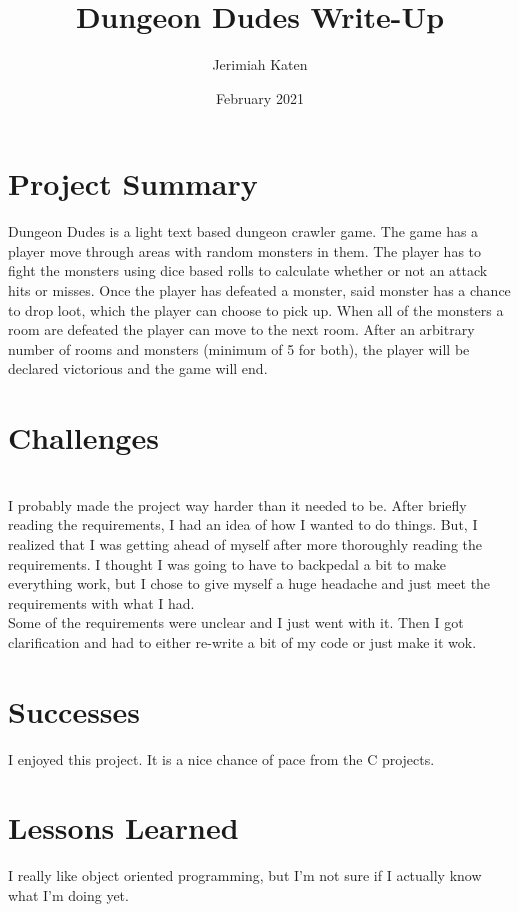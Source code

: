 \documentclass{article}
\title{Dungeon Dudes Write-Up}
\author{Jerimiah Katen}
\date{February 2021}
\begin{document}
\maketitle

\section{Project Summary}

Dungeon Dudes is a light text based dungeon crawler game. The game has a player move through areas with random monsters in them. The player has to fight the monsters using dice based rolls to calculate whether or not an attack hits or misses. Once the player has defeated a monster, said monster has a chance to drop loot, which the player can choose to pick up. When all of the monsters a room are defeated the player can move to the next room. After an arbitrary number of rooms and monsters (minimum of 5 for both), the player will be declared victorious and the game will end.

\section{Challenges}

\\[.5cm]
I probably made the project way harder than it needed to be. After briefly reading the requirements, I had an idea of how I wanted to do things. But, I realized that I was getting ahead of myself after more thoroughly reading the requirements. I thought I was going to have to backpedal a bit to make everything work, but I chose to give myself a huge headache and just meet the requirements with what I had.
\\[.5cm]
Some of the requirements were unclear and I just went with it. Then I got clarification and had to either re-write a bit of my code or just make it wok.


\section{Successes}
I enjoyed this project. It is a nice chance of pace from the C projects.

\section{Lessons Learned}
I really like object oriented programming, but I'm not sure if I actually know what I'm doing yet.
\end{document}
